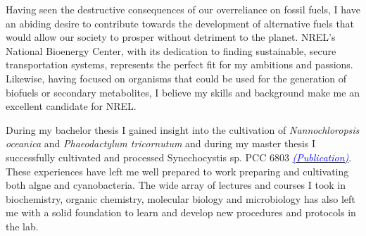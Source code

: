 \documentclass[11pt,a4paper,sans]{moderncv}
\begin{document}

       
\makelettertitle
\begin{spacing}{1.15}

Having seen the destructive consequences of our overreliance on fossil fuels, I have an abiding desire to contribute towards the development of alternative fuels that would allow our society to prosper without detriment to the planet. %
NREL's National Bioenergy Center, with its dedication to finding sustainable, secure transportation systems, represents the perfect fit for my ambitions and passions. %
Likewise, having focused on organisms that could be used for the generation of biofuels or secondary metabolites, I believe my skills and background make me an excellent candidate for NREL.\par\vspace*{1mm} %

During my bachelor thesis I gained insight into the cultivation of \textit{Nannochloropsis oceanica} and \textit{Phaeodactylum tricornutum} and during my master thesis I successfully cultivated and processed Synechocystis sp. PCC 6803 {\href{https://www.ncbi.nlm.nih.gov/pubmed/29517395}{\textcolor{blue}{{\textit{(Publication)}}}}}. %
These experiences have left me well prepared to work preparing and cultivating both algae and cyanobacteria. %
The wide array of lectures and courses I took in biochemistry, organic chemistry, molecular biology and microbiology has also left me with a solid foundation to learn and develop new procedures and protocols in the lab.\par\vspace*{1mm} %


\end{spacing}
\end{document}
